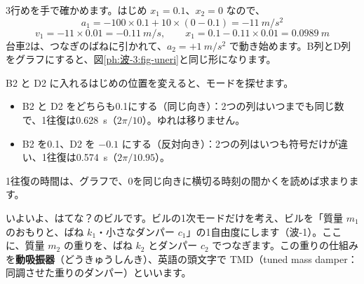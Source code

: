\begin{bkcenter}
\label{ph:波-3:tab-sheet}
\end{bkcenter}

\noindent 3行めを手で確かめます。はじめ $x_1=0.1$、$x_2=0$ なので、
\[a_1=-100\times0.1+10\times(0-0.1)=\qty{-11}{m/s^2}\]
\[v_1=-11\times0.01=\qty{-0.11}{m/s},\qquad x_1=0.1-0.11\times0.01=\qty{0.0989}{m}\]
台車2は、つなぎのばねに引かれて、$a_2=+\qty{1}{m/s^2}$ で動き始めます。B列とD列をグラフにすると、図\ref{ph:波-3:fig-uneri}と同じ形になります。

B2 と D2 に入れるはじめの位置を変えると、モードを探せます。
\begin{itemize}[leftmargin=1.2\zw, itemsep=1pt, topsep=1pt, label={\color{\bkTT}●}]
\item B2 と D2 をどちらも0.1にする（同じ向き）：2つの列はいつまでも同じ数で、1往復は\qty{0.628}{s}（$2\pi/10$）。ゆれは移りません。
\item B2 を0.1、D2 を $-0.1$ にする（反対向き）：2つの列はいつも符号だけが違い、1往復は\qty{0.574}{s}（$2\pi/10.95$）。
\end{itemize}
1往復の時間は、グラフで、0を同じ向きに横切る時刻の間かくを読めば求まります。

いよいよ、はてな？のビルです。ビルの1次モードだけを考え、ビルを「質量 $m_1$ のおもりと、ばね $k_1$・小さなダンパー $c_1$」の1自由度にします（波-1）。ここに、質量 $m_2$ の重りを、ばね $k_2$ とダンパー $c_2$ でつなぎます。この重りの仕組みを\textbf{動吸振器}（どうきゅうしんき）、英語の頭文字で TMD（tuned mass damper：同調させた重りのダンパー）といいます。

